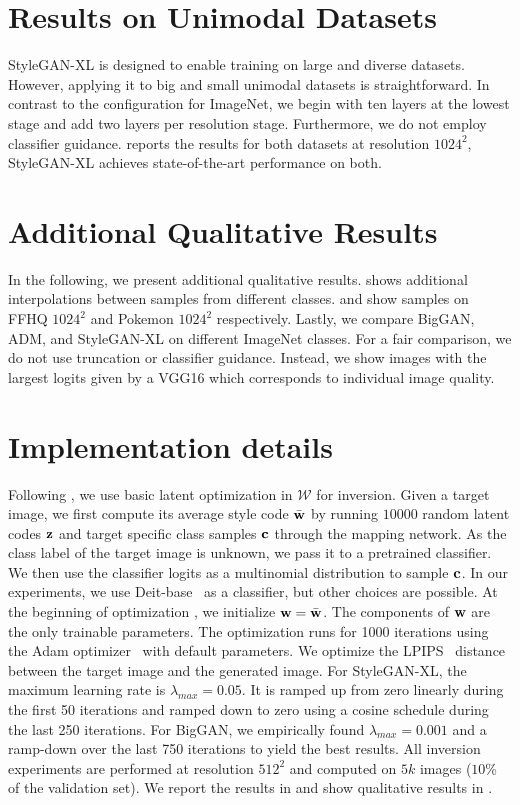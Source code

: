 \section{Results on Unimodal Datasets}
StyleGAN-XL is designed to enable training on large and diverse datasets. However, applying it to big and small unimodal datasets is straightforward. 
In contrast to the configuration for ImageNet, we begin with ten layers at the lowest stage and add two layers per resolution stage. Furthermore, we do not employ classifier guidance.
 reports the results for both datasets at resolution $1024^2$, StyleGAN-XL achieves state-of-the-art performance on both.
\extraresults

\section{Additional Qualitative Results}

In the following, we present additional qualitative results.  shows additional interpolations between samples from different classes.  and  show samples on FFHQ $1024^2$ and Pokemon $1024^2$ respectively. Lastly, we compare BigGAN, ADM, and StyleGAN-XL on different ImageNet classes. For a  fair comparison, we do not use truncation or classifier guidance. Instead, we show images with the largest logits given by a VGG16 which corresponds to individual image quality.

\section{Implementation details}

Following \cite{Karras2020CVPR}, we use basic latent optimization in $\mathcal{W}$ for inversion. Given a target image, we first compute its average style code $\bar{\mathbf{w}}$ by running $10000$ random latent codes $\mathbf{z}$ and target specific class samples $\mathbf{c}$ through the mapping network. As the class label of the target image is unknown, we pass it to a pretrained classifier. We then use the classifier logits as a multinomial distribution to sample $\mathbf{c}$. In our experiments, we use Deit-base~\cite{Touvron2021ICML} as a classifier, but other choices are possible.
At the beginning of optimization , we initialize $\mathbf{w} = \bar{\mathbf{w}}$. The components of $\mathbf{w}$ are the only trainable parameters. The optimization runs for 1000 iterations using the Adam optimizer~\cite{Kingma2015ICLR} with default parameters. 
We optimize the LPIPS~\cite{Zhang2018CVPR} distance between the target image and the generated image.
For StyleGAN-XL, the maximum learning rate is $\lambda_{max} = 0.05$. It is ramped up from zero linearly during the first 50 iterations and ramped down to zero using a cosine schedule during the last 250 iterations. 
For BigGAN, we empirically found $\lambda_{max} = 0.001$ and a ramp-down over the last 750 iterations to yield the best results. 
All inversion experiments are performed at resolution $512^2$ and computed on $5k$ images ($10$\% of the validation set). We report the results in  and show qualitative results in .
\invresults

